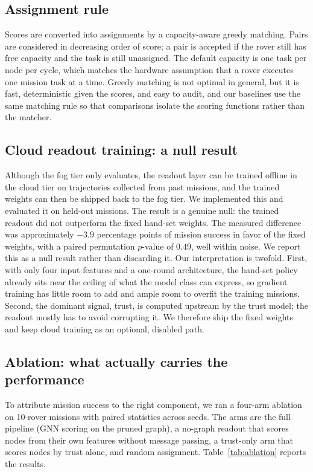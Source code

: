 \subsection{Assignment rule}

Scores are converted into assignments by a capacity-aware greedy matching.
Pairs are considered in decreasing order of score; a pair is accepted if the
rover still has free capacity and the task is still unassigned. The default
capacity is one task per node per cycle, which matches the hardware
assumption that a rover executes one mission task at a time. Greedy matching
is not optimal in general, but it is fast, deterministic given the scores,
and easy to audit, and our baselines use the same matching rule so that
comparisons isolate the scoring functions rather than the matcher.

\subsection{Cloud readout training: a null result}

Although the fog tier only evaluates, the readout layer can be trained
offline in the cloud tier on trajectories collected from past missions, and
the trained weights can then be shipped back to the fog tier. We implemented
this and evaluated it on held-out missions. The result is a genuine null:
the trained readout did not outperform the fixed hand-set weights. The
measured difference was approximately $-3.9$ percentage points of mission
success in favor of the fixed weights, with a paired permutation $p$-value
of $0.49$, well within noise. We report this as a null result rather than
discarding it. Our interpretation is twofold. First, with only four input
features and a one-round architecture, the hand-set policy already sits near
the ceiling of what the model class can express, so gradient training has
little room to add and ample room to overfit the training missions. Second,
the dominant signal, trust, is computed upstream by the trust model; the
readout mostly has to avoid corrupting it. We therefore ship the fixed
weights and keep cloud training as an optional, disabled path.

\subsection{Ablation: what actually carries the performance}

To attribute mission success to the right component, we ran a four-arm
ablation on 10-rover missions with paired statistics across seeds. The arms
are the full pipeline (GNN scoring on the pruned graph), a no-graph readout
that scores nodes from their own features without message passing, a
trust-only arm that scores nodes by trust alone, and random assignment.
Table~\ref{tab:ablation} reports the results.

